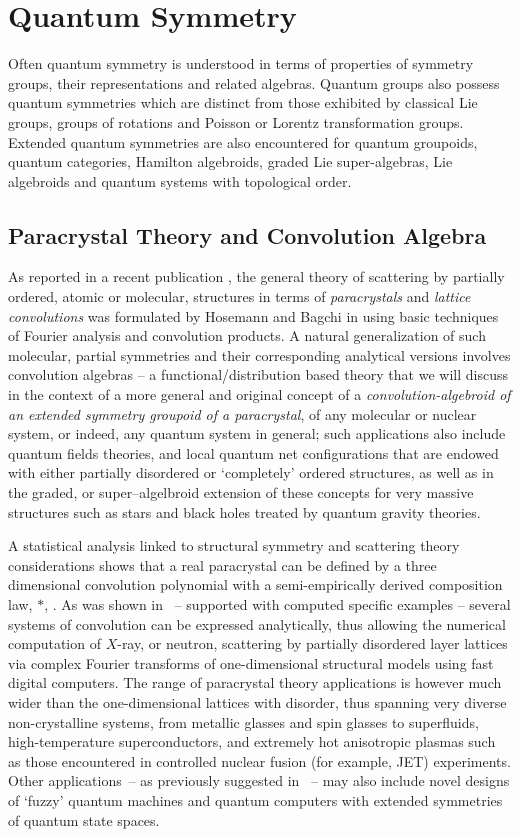 \documentclass[12pt]{article}
\theoremstyle{plain}
\theoremstyle{definition}
\numberwithin{equation}{section}
\begin{document}
\section{Quantum Symmetry}
Often quantum symmetry is understood in terms of properties of symmetry groups, their representations and related algebras. Quantum groups also possess quantum symmetries which are distinct from those exhibited by classical Lie groups, groups of rotations and Poisson or Lorentz transformation groups. Extended quantum symmetries are also encountered for quantum groupoids, quantum categories, Hamilton algebroids, graded Lie super-algebras, Lie algebroids and quantum systems with topological order.

\subsection{Paracrystal Theory and Convolution Algebra}

As reported in a recent publication \cite{BGB1},  the general theory of scattering by partially ordered, atomic or molecular, structures in terms of \emph{paracrystals} and \emph{lattice convolutions} was formulated by Hosemann and Bagchi in  \cite{Hosemann-Bagchi62} using basic techniques of Fourier analysis and convolution products.
A natural generalization of such molecular, partial symmetries and their corresponding analytical versions involves convolution algebras -- a functional/distribution \cite{Schwartz45,Schwartz52} based theory that  we will discuss in the context of a more general and original concept of a \emph{convolution-algebroid of an extended symmetry groupoid of a paracrystal}, of any molecular or nuclear system, or indeed, any quantum system in general; such applications also  include quantum f\/ields theories, and local quantum net conf\/igurations that are endowed with either partially disordered or `completely' ordered structures, as well as in the graded, or super--algelbroid extension of these concepts for very massive structures such as stars and black holes treated by quantum gravity theories.

A statistical analysis linked to structural symmetry and scattering theory considerations shows that a real paracrystal can be defined by a three dimensional convolution polynomial
with a semi-empirically derived composition law, $*$, \cite{Hosemann-etal81}. As was shown in \cite{Baianu74,Baianu78}~-- supported
with computed specific examples -- several systems of convolution can be expressed analytically, thus allowing the numerical computation
of $X$-ray, or neutron, scattering by partially disordered layer lattices via complex Fourier transforms of one-dimensional structural models
using fast digital computers.  The range of paracrystal theory applications is however much wider than the one-dimensional lattices with disorder, thus spanning very diverse non-crystalline systems, from metallic glasses and spin glasses to superfluids, high-temperature superconductors, and extremely hot anisotropic plasmas such as those encountered in controlled nuclear fusion (for example, JET) experiments. Other applications~-- as previously suggested in \cite{Baianu71}~-- may also include novel designs of `fuzzy' quantum machines and quantum computers with extended symmetries of quantum state spaces.
\end{document}
